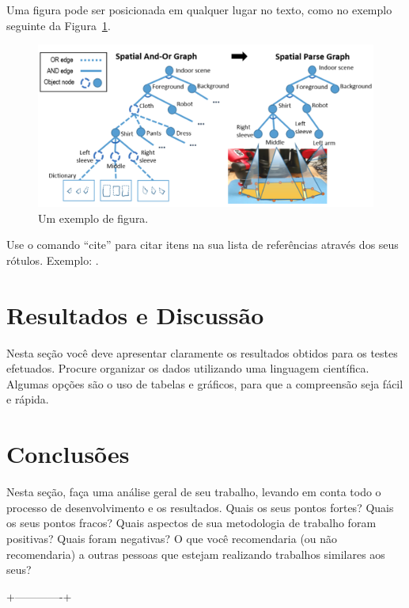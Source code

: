 \documentclass[twoside,conference,a4paper]{IEEEtran}
\begin{document}
	Uma figura pode ser posicionada em qualquer lugar no texto, como no exemplo seguinte da Figura~\ref{fig:fig1}.
	
	\begin{figure}[ht]
		\centering
		\includegraphics[width=1\hsize]{figuras/pipeline.png}
		\caption{Um exemplo de figura.}
		\label{fig:fig1}
	\end{figure}
	
	Use o comando ``cite'' para citar itens na sua lista de
	referências através dos seus rótulos. Exemplo: \cite{Rowling:1997}\cite{Reynolds:2009a}\cite{Michalowski:2006}.
	
	
	\section{Resultados e Discussão}
	
	Nesta seção você deve apresentar claramente os resultados obtidos para os testes efetuados. Procure organizar os dados utilizando uma linguagem científica. Algumas opções são o uso de tabelas e gráficos, para que a compreensão seja fácil e rápida. 
	
	\section{Conclusões}
	
	Nesta seção, faça uma análise geral de seu trabalho, levando em conta todo o processo de desenvolvimento e os resultados. Quais os seus pontos fortes? Quais os seus pontos fracos? Quais aspectos de sua metodologia de trabalho foram positivas? Quais foram negativas? O que você recomendaria (ou não recomendaria) a outras pessoas que estejam realizando trabalhos similares aos seus? 
	
	
	+-------------+
	
	
	
	
	
	
	
\end{document}
